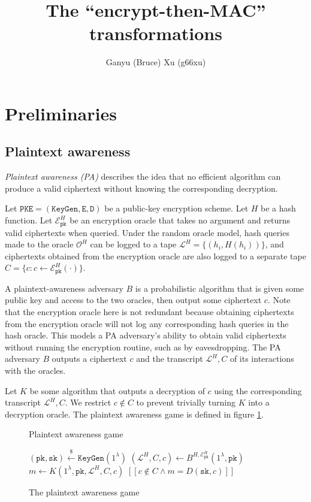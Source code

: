\documentclass{article}
\title{The ``encrypt-then-MAC'' transformations}
\author{Ganyu (Bruce) Xu (g66xu)}
\newcommand{\monospace}{\texttt}
\newcommand{\pke}{\monospace{PKE}}
\newcommand{\keygen}{\monospace{KeyGen}}
\newcommand{\encrypt}{\monospace{E}}
\newcommand{\decrypt}{\monospace{D}}
\newcommand{\pk}{\monospace{pk}}
\newcommand{\sk}{\monospace{sk}}
\newcommand{\leftsample}{\stackrel{\$}{\leftarrow}}
\newcommand{\llbrack}{[\![}
\newcommand{\rrbrack}{]\!]}
\begin{document}

\section{Preliminaries}
\subsection{Plaintext awareness}
\emph{Plaintext awareness (PA)}\cite{bellare1995optimal,bellare1998relations} describes the idea that no efficient algorithm can produce a valid ciphertext without knowing the corresponding decryption. 

Let $\pke = (\keygen, \encrypt, \decrypt)$ be a public-key encryption scheme. Let $H$ be a hash function. Let $\mathcal{E}^H_\pk$ be an encryption oracle that takes no argument and returns valid ciphertexts when queried. Under the random oracle model, hash queries made to the oracle $\mathcal{O}^H$ can be logged to a tape $\mathcal{L}^H = \{(h_i, H(h_i))\}$, and ciphertexts obtained from the encryption oracle are also logged to a separate tape $C = \{c : c \leftarrow \mathcal{E}^H_\pk(\cdot)\}$.

A plaintext-awareness adversary $B$ is a probabilistic algorithm that is given some public key and access to the two oracles, then output some ciphertext $c$. Note that the encryption oracle here is not redundant because obtaining ciphertexts from the encryption oracle will not log any corresponding hash queries in the hash oracle. This models a PA adversary's ability to obtain valid ciphertexts without running the encryption routine, such as by eavesdropping. The PA adversary $B$ outputs a ciphertext $c$ and the transcript $\mathcal{L}^H, C$ of its interactions with the oracles.

Let $K$ be some algorithm that outputs a decryption of $c$ using the corresponding transcript $\mathcal{L}^H, C$. We restrict $c \not \in C$ to prevent trivially turning $K$ into a decryption oracle. The plaintext awareness game is defined in figure \ref{fig:pa-game}.

\begin{figure}[H]
    \begin{algorithm}[H]
        \caption{Plaintext awareness game}\label{alg:pa-game}
        \begin{algorithmic}[1]
            \State $(\pk, \sk) \leftsample \keygen(1^\lambda)$
            \State $(\mathcal{L}^H, C, c) \leftarrow B^{H, \mathcal{E}^H_\pk}(1^\lambda, \pk)$
            \State $m \leftarrow K(1^\lambda, \pk, \mathcal{L}^H, C, c)$
            \State \Return $\llbrack c \not\in C \land m = D(\sk, c) \rrbrack$
        \end{algorithmic}
    \end{algorithm}
    \caption{The plaintext awareness game}\label{fig:pa-game}
\end{figure}
\end{document}
